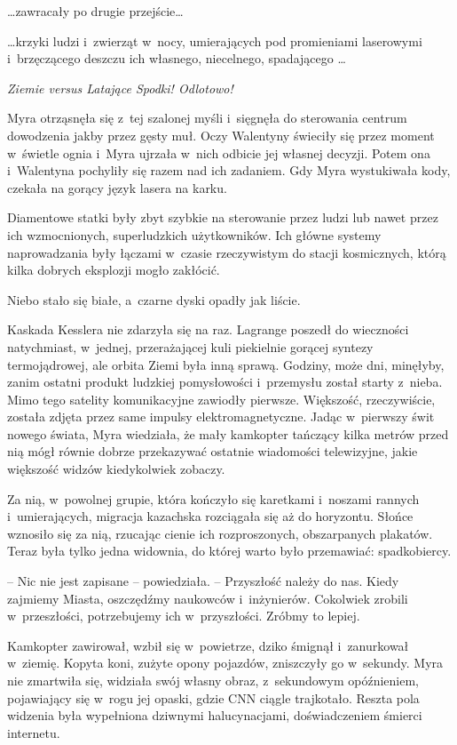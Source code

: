 \documentclass[oneside,polish,11pt,sfheadings]{mwbk}
\begin{document}
\ldots zawracały po drugie przejście\ldots

\ldots krzyki ludzi i~zwierząt w~nocy, umierających pod promieniami
laserowymi i~brzęczącego deszczu ich własnego, niecelnego, spadającego
\ldots

\textit{Ziemie versus Latające Spodki! Odlotowo!}

Myra otrząsnęła się z~tej szalonej myśli i~sięgnęła do sterowania
centrum dowodzenia jakby przez gęsty muł. Oczy Walentyny świeciły się
przez moment w~świetle ognia i~Myra ujrzała w~nich odbicie jej własnej
decyzji. Potem ona i~Walentyna pochyliły się razem nad ich zadaniem. Gdy
Myra wystukiwała kody, czekała na gorący język lasera na karku.

Diamentowe statki były zbyt szybkie na sterowanie przez ludzi lub nawet
przez ich wzmocnionych, superludzkich użytkowników. Ich główne systemy
naprowadzania były łączami w~czasie rzeczywistym do stacji kosmicznych,
którą kilka dobrych eksplozji mogło zakłócić.

Niebo stało się białe, a~czarne dyski opadły jak liście.

Kaskada Kesslera nie zdarzyła się na raz. Lagrange poszedł do wieczności
natychmiast, w~jednej, przerażającej kuli piekielnie gorącej syntezy
termojądrowej, ale orbita Ziemi była inną sprawą. Godziny, może dni,
minęłyby, zanim ostatni produkt ludzkiej pomysłowości i~przemysłu został
starty z~nieba. Mimo tego satelity komunikacyjne zawiodły pierwsze.
Większość, rzeczywiście, została zdjęta przez same impulsy
elektromagnetyczne. Jadąc w~pierwszy świt nowego świata, Myra wiedziała,
że mały kamkopter tańczący kilka metrów przed nią mógł równie dobrze
przekazywać ostatnie wiadomości telewizyjne, jakie większość widzów
kiedykolwiek zobaczy.

Za nią, w~powolnej grupie, która kończyło się karetkami i~noszami
rannych i~umierających, migracja kazachska rozciągała się aż do
horyzontu. Słońce wznosiło się za nią, rzucając cienie ich
rozproszonych, obszarpanych plakatów. Teraz była tylko jedna widownia,
do której warto było przemawiać: spadkobiercy.

-- Nic nie jest zapisane -- powiedziała. -- Przyszłość należy do nas. Kiedy
zajmiemy Miasta, oszczędźmy naukowców i~inżynierów. Cokolwiek zrobili w~przeszłości, potrzebujemy ich w~przyszłości. Zróbmy to lepiej.

Kamkopter zawirował, wzbił się w~powietrze, dziko śmignął i~zanurkował w~ziemię. Kopyta koni, zużyte opony pojazdów, zniszczyły go w~sekundy.
Myra nie zmartwiła się, widziała swój własny obraz, z~sekundowym
opóźnieniem, pojawiający się w~rogu jej opaski, gdzie CNN ciągle
trajkotało. Reszta pola widzenia była wypełniona dziwnymi halucynacjami,
doświadczeniem śmierci internetu.
\end{document}
